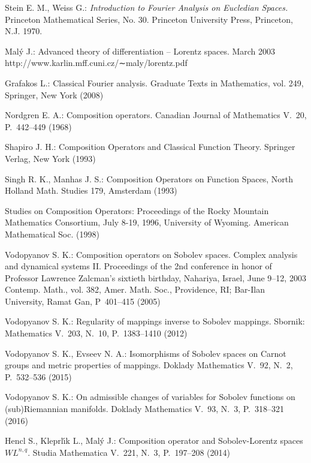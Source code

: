 \documentclass{birkjour}
\theoremstyle{definition}
\theoremstyle{remark}
\numberwithin{equation}{section}
\begin{document}
\begin{thebibliography}{1}

Stein E. M., Weiss G.:
\textit{Introduction to Fourier Analysis on Eucledian Spaces.}
Princeton Mathematical Series, No. 30. Princeton University Press, Princeton, N.J. 1970.

Mal{\'y} J.: Advanced theory of differentiation – Lorentz spaces. March 2003
http://www.karlin.mff.cuni.cz/∼maly/lorentz.pdf

Grafakos L.:
Classical Fourier analysis.
Graduate Texts in Mathematics, vol. 249, Springer, New York (2008)

Nordgren E. A.:
Composition operators.
Canadian Journal of Mathematics V.~20, P.~442--449 (1968)

Shapiro J. H.:
Composition Operators and Classical Function Theory.
Springer Verlag, New York (1993)

Singh R. K., Manhas J. S.:
Composition Operators on Function Spaces,
North Holland Math. Studies 179, Amsterdam (1993)

Studies on Composition Operators: Proceedings of the Rocky Mountain Mathematics Consortium, July 8-19, 1996, University of Wyoming.
American Mathematical Soc. (1998)


Vodopyanov S. K.:
Composition operators on Sobolev spaces.
Complex analysis and dynamical systems II. Proceedings of the 2nd conference in honor of Professor Lawrence Zalcman's sixtieth birthday, Nahariya, Israel, June 9--12, 2003
Contemp. Math., vol. 382, Amer. Math. Soc., Providence, RI; Bar-Ilan University, Ramat Gan, P~401--415 (2005)

Vodopyanov S. K.:
Regularity of mappings inverse to Sobolev mappings.
Sbornik: Mathematics  V.~203, N.~10, P.~1383--1410 (2012)


Vodopyanov S. K.,  Evseev N. A.:
Isomorphisms of Sobolev spaces on Carnot groups and metric properties of mappings.
Doklady Mathematics V.~92, N.~2, P.~532--536 (2015)

Vodopyanov S. K.:
On admissible changes of variables for Sobolev functions on (sub)Riemannian manifolds.
Doklady Mathematics V.~93, N.~3, P.~318--321 (2016)

Hencl S., Kleprl{\'\i}k L., Mal{\'y} J.:
Composition operator and Sobolev-Lorentz spaces $WL^{n,q}$.
Studia Mathematica V.~221, N.~3, P.~197--208 (2014)  



\end{thebibliography}
\end{document}
